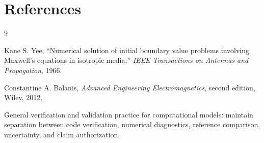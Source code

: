 \documentclass[11pt,a4paper]{article}
\begin{document}
\section{References}

\begin{thebibliography}{9}

Kane S. Yee,
``Numerical solution of initial boundary value problems involving Maxwell's equations in isotropic media,''
\emph{IEEE Transactions on Antennas and Propagation}, 1966.

Constantine A. Balanis,
\emph{Advanced Engineering Electromagnetics},
second edition, Wiley, 2012.

General verification and validation practice for computational models:
maintain separation between code verification, numerical diagnostics, reference comparison, uncertainty, and claim authorization.

\end{thebibliography}
\end{document}
